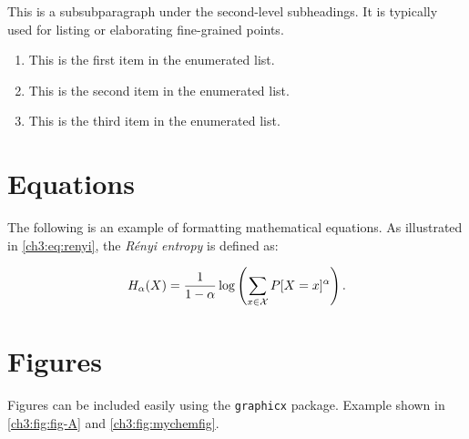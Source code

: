 \begin{subsubparagraph}
This is a subsubparagraph under the second-level subheadings. It is typically used for listing or elaborating fine-grained points.
\end{subsubparagraph}

\begin{enumerate}[itemindent=\subsubparitemindent]
    \label{ch3:enum:example}
    \item This is the first item in the enumerated list.
    \item This is the second item in the enumerated list.
    \item This is the third item in the enumerated list.
\end{enumerate}

    
\section{Equations}
\begin{paragraph}
The following is an example of formatting mathematical equations. As illustrated in \autoref{ch3:eq:renyi}, the {\em R\'enyi entropy} is defined as:
\end{paragraph}

\begin{equation}
\label{ch3:eq:renyi}
H_{\alpha}(X) =
\frac{1}{1-\alpha}
\log \left(\sum_{x \in {\cal X}}P[X=x]^{\alpha} \right) .
\end{equation}

\section{Figures}
\begin{paragraph}
Figures can be included easily using the \texttt{graphicx} package. Example shown in \autoref{ch3:fig:fig-A} and \autoref{ch3:fig:mychemfig}.
\end{paragraph}

